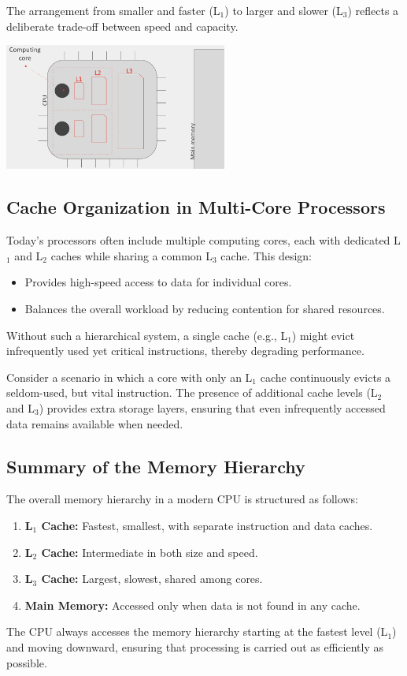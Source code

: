 \documentclass[../../compsys.tex]{subfiles}
\begin{document}
The arrangement from smaller and faster (L\(_1\)) to larger and slower (L\(_3\)) reflects a deliberate trade-off between speed and capacity.

\begin{center}
  \includegraphics[width=0.55\textwidth]{chapters/L4/images/cpu-cache2.png}
\end{center}

\subsection{Cache Organization in Multi-Core Processors}
Today's processors often include multiple computing cores, each with dedicated L\(_1\) and L\(_2\) caches while sharing a common L\(_3\) cache. This design:
\begin{itemize}
    \item Provides high-speed access to data for individual cores.
    \item Balances the overall workload by reducing contention for shared resources.
\end{itemize}
Without such a hierarchical system, a single cache (e.g., L\(_1\)) might evict infrequently used yet critical instructions, thereby degrading performance.

\begin{example}
Consider a scenario in which a core with only an L\(_1\) cache continuously evicts a seldom-used, but vital instruction. The presence of additional cache levels (L\(_2\) and L\(_3\)) provides extra storage layers, ensuring that even infrequently accessed data remains available when needed.
\end{example}

\subsection{Summary of the Memory Hierarchy}
The overall memory hierarchy in a modern CPU is structured as follows:
\begin{enumerate}
    \item \textbf{L\(_1\) Cache:} Fastest, smallest, with separate instruction and data caches.
    \item \textbf{L\(_2\) Cache:} Intermediate in both size and speed.
    \item \textbf{L\(_3\) Cache:} Largest, slowest, shared among cores.
    \item \textbf{Main Memory:} Accessed only when data is not found in any cache.
\end{enumerate}
The CPU always accesses the memory hierarchy starting at the fastest level (L\(_1\)) and moving downward, ensuring that processing is carried out as efficiently as possible.
\end{document}
